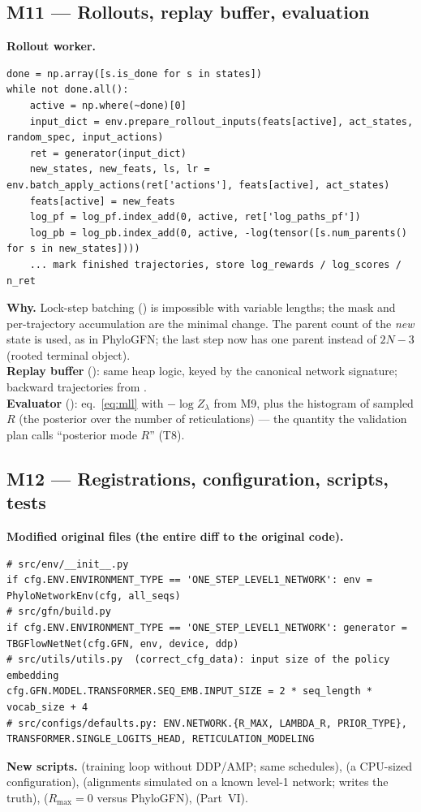\subsection{M11 --- Rollouts, replay buffer, evaluation}
\textbf{Rollout worker.}
\begin{lstlisting}
done = np.array([s.is_done for s in states])
while not done.all():
    active = np.where(~done)[0]
    input_dict = env.prepare_rollout_inputs(feats[active], act_states, random_spec, input_actions)
    ret = generator(input_dict)
    new_states, new_feats, ls, lr = env.batch_apply_actions(ret['actions'], feats[active], act_states)
    feats[active] = new_feats
    log_pf = log_pf.index_add(0, active, ret['log_paths_pf'])
    log_pb = log_pb.index_add(0, active, -log(tensor([s.num_parents() for s in new_states])))
    ... mark finished trajectories, store log_rewards / log_scores / n_ret
\end{lstlisting}
\textbf{Why.} Lock-step batching () is impossible with variable lengths; the  mask and per-trajectory accumulation are the minimal change. The parent count of the \emph{new} state is used, as in PhyloGFN; the last step now has one parent instead of $2N-3$ (rooted terminal object).\\
\textbf{Replay buffer} (): same heap logic, keyed by the canonical network signature; backward trajectories from .\\
\textbf{Evaluator} (): eq.~\eqref{eq:mll} with $-\log Z_\lambda$ from M9, plus the histogram of sampled $R$ (the posterior over the number of reticulations) --- the quantity the validation plan calls ``posterior mode $R$'' (T8).

\subsection{M12 --- Registrations, configuration, scripts, tests}
\textbf{Modified original files (the entire diff to the original code).}
\begin{lstlisting}
# src/env/__init__.py
if cfg.ENV.ENVIRONMENT_TYPE == 'ONE_STEP_LEVEL1_NETWORK': env = PhyloNetworkEnv(cfg, all_seqs)
# src/gfn/build.py
if cfg.ENV.ENVIRONMENT_TYPE == 'ONE_STEP_LEVEL1_NETWORK': generator = TBGFlowNetNet(cfg.GFN, env, device, ddp)
# src/utils/utils.py  (correct_cfg_data): input size of the policy embedding
cfg.GFN.MODEL.TRANSFORMER.SEQ_EMB.INPUT_SIZE = 2 * seq_length * vocab_size + 4
# src/configs/defaults.py: ENV.NETWORK.{R_MAX, LAMBDA_R, PRIOR_TYPE}, TRANSFORMER.SINGLE_LOGITS_HEAD, RETICULATION_MODELING
\end{lstlisting}
\textbf{New scripts.}  (training loop without DDP/AMP; same schedules),  (a CPU-sized configuration),  (alignments simulated on a known level-1 network; writes the truth),  ($R_{\max}=0$ versus PhyloGFN),  (Part~VI).
\clearpage
